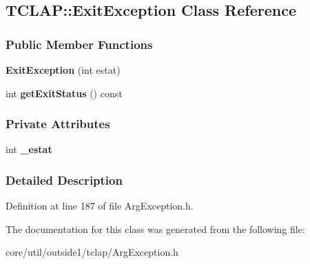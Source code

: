 \hypertarget{classTCLAP_1_1ExitException}{}\subsection{T\+C\+L\+AP\+:\+:Exit\+Exception Class Reference}
\label{classTCLAP_1_1ExitException}
\subsubsection*{Public Member Functions}
\begin{DoxyCompactItemize}
\item 
{\bfseries Exit\+Exception} (int estat)\hypertarget{classTCLAP_1_1ExitException_a03a48ed9da416c8261edbd9cbbf85b27}{}\label{classTCLAP_1_1ExitException_a03a48ed9da416c8261edbd9cbbf85b27}

\item 
int {\bfseries get\+Exit\+Status} () const \hypertarget{classTCLAP_1_1ExitException_acf7fd20c9cfb67b5718031ed0debda1c}{}\label{classTCLAP_1_1ExitException_acf7fd20c9cfb67b5718031ed0debda1c}

\end{DoxyCompactItemize}
\subsubsection*{Private Attributes}
\begin{DoxyCompactItemize}
\item 
int {\bfseries \+\_\+estat}\hypertarget{classTCLAP_1_1ExitException_ad1e2fb2092d0e3470ff837d6e6f84f89}{}\label{classTCLAP_1_1ExitException_ad1e2fb2092d0e3470ff837d6e6f84f89}

\end{DoxyCompactItemize}


\subsubsection{Detailed Description}


Definition at line 187 of file Arg\+Exception.\+h.



The documentation for this class was generated from the following file\+:\begin{DoxyCompactItemize}
\item 
core/util/outside1/tclap/Arg\+Exception.\+h\end{DoxyCompactItemize}

